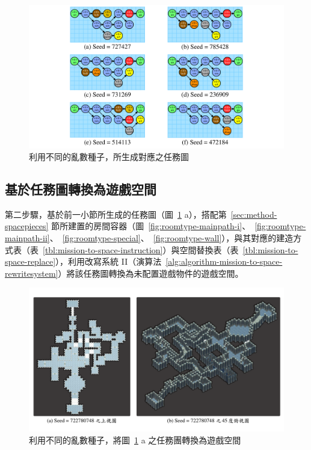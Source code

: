 \begin{figure}[H]
  \begin{center}
    \includegraphics[width=1.0\textwidth]{figures/experiments/experiment-mission-graphs.pdf}
    \caption{利用不同的亂數種子，所生成對應之任務圖}
    \label{fig:experiment-mission-graphs}
  \end{center}
\end{figure}

\subsection{基於任務圖轉換為遊戲空間}
\label{ssec:experiment-diagram-missiontospace}

第二步驟，基於前一小節所生成的任務圖（圖~\ref{fig:experiment-mission-graphs} a），搭配第~\ref{sec:method-spacepieces} 節所建置的房間容器（圖~\ref{fig:roomtype-mainpath-i}、~\ref{fig:roomtype-mainpath-ii}、~\ref{fig:roomtype-special}、~\ref{fig:roomtype-wall}），與其對應的建造方式表（表~\ref{tbl:mission-to-space-instruction}）與空間替換表（表~\ref{tbl:mission-to-space-replace}），利用改寫系統 II（演算法~\ref{alg:algorithm-mission-to-space-rewritesystem}）將該任務圖轉換為未配置遊戲物件的遊戲空間。

\begin{landscape}
  \begin{figure}[H]
    \begin{center}
      \includegraphics[width=1.05\linewidth]{figures/experiments/experiment-spaces-722780748.pdf}
      \caption{利用不同的亂數種子，將圖~\protect\ref{fig:experiment-mission-graphs} a 之任務團轉換為遊戲空間}
      \label{fig:experiment-spaces}
    \end{center}
  \end{figure}
\end{landscape}

